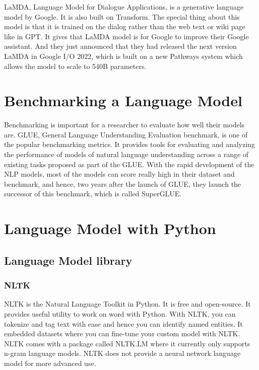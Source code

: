 \documentclass[a4paper, 11pt]{article}
\begin{document}
LaMDA\cite{thoppilan2022lamda}, Language Model for Dialogue Applications, is a generative language model by Google. It is also built on Transform. The special thing about this model is that it is trained on the dialog rather than the web text or wiki page like in GPT. It gives that LaMDA model is for Google to improve their Google assistant. And they just announced that they had released the next version LaMDA in Google I/O 2022, which is built on a new Pathways\cite{chowdhery2022palm} system which allows the model to scale to 540B parameters.

\section{Benchmarking a Language Model}

Benchmarking is important for a researcher to evaluate how well their models are. GLUE\cite{wang2018multitask}, General Language Understanding Evaluation benchmark, is one of the popular benchmarking metrics. It provides tools for evaluating and analyzing the performance of models of natural language understanding across a range of existing tasks proposed as part of the GLUE. With the rapid development of the NLP models, most of the models can score really high in their dataset and benchmark, and hence, two years after the launch of GLUE, they launch the successor of this benchmark, which is called SuperGLUE\cite{wang2020superglue}.  
  
\section{Language Model with Python}

\subsection{Language Model library}

\subsubsection{NLTK}

NLTK\cite{NLTKBook} is the Natural Language Toolkit in Python. It is free and open-source. It provides useful utility to work on word with Python. With NLTK, you can tokenize and tag text with ease and hence you can identify named entities. It embedded datasets where you can fine-tune your custom model with NLTK. NLTK comes with a package called NLTK.LM where it currently only supports n-gram language models. NLTK does not provide a neural network language model for more advanced use.\\
\end{document}
